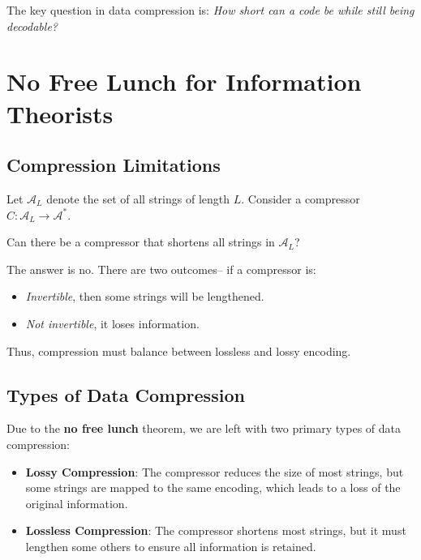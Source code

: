 The key question in data compression is: \textit{How short can a code be while still being decodable?}

\section{No Free Lunch for Information Theorists}

\subsection{Compression Limitations}
Let \( \mathcal{A}_L \) denote the set of all strings of length \( L \). Consider a compressor \( C : \mathcal{A}_L \rightarrow \mathcal{A}^* \). \bigskip

Can there be a compressor that shortens all strings in \( \mathcal{A}_L \)?\bigskip


The answer is no. There are two outcomes– if a compressor is:
\begin{itemize}
    \item \textit{Invertible}, then some strings will be lengthened.
    \item \textit{Not invertible}, it loses information.
\end{itemize}
Thus, compression must balance between lossless and lossy encoding.

\subsection{Types of Data Compression}

Due to the \textbf{no free lunch} theorem, we are left with two primary types of data compression:

\begin{itemize}
    \item \textbf{Lossy Compression}: The compressor reduces the size of most strings, but some strings are mapped to the same encoding, which leads to a loss of the original information.

    \item \textbf{Lossless Compression}: The compressor shortens most strings, but it must lengthen some others to ensure all information is retained.
\end{itemize}

